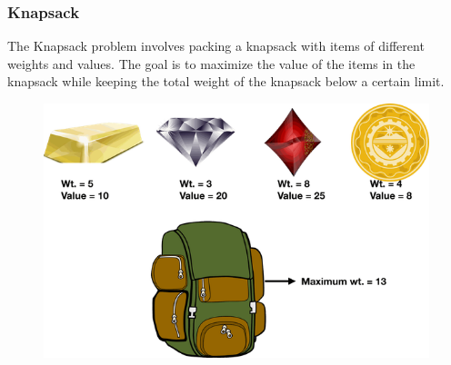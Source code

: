 \documentclass[
	11pt,
]{beamer}
\begin{document}
\begin{frame}
	\frametitle{Knapsack}
	The Knapsack problem involves packing a knapsack with items of different weights and values. The goal is to maximize the value of the items in the knapsack while keeping the total weight of the knapsack below a certain limit.
    \begin{figure}
        \centering
        \includegraphics[scale=0.3]{Figs/knapsack.png}
    \end{figure}
\end{frame}
\end{document}
